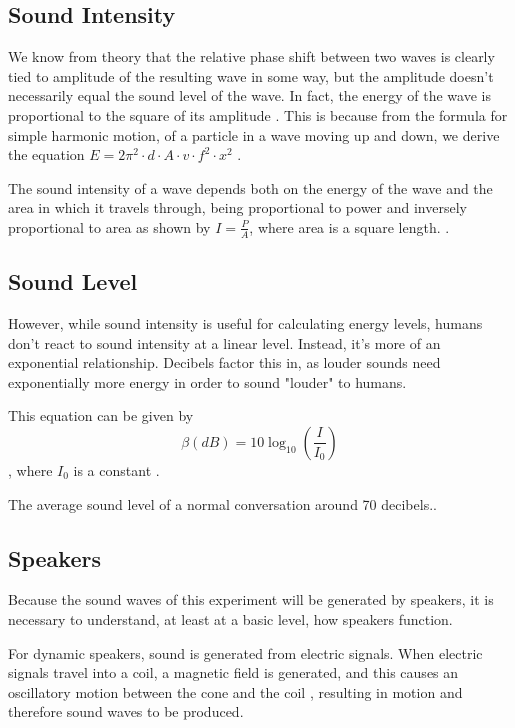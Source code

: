\documentclass[index]{subfiles}
\begin{document}
\subsection{Sound Intensity}

We know from theory that the relative phase shift between two waves is clearly tied to amplitude of the resulting wave in some way, but the amplitude doesn't necessarily equal the sound level of the wave. In fact, the energy of the wave is proportional to the square of its amplitude \cite{openstax}. This is because from the formula for simple harmonic motion, of a particle in a wave moving up and down, we derive the equation \(E=2\pi^2\cdot d\cdot A\cdot v\cdot f^2\cdot x^2\) \cite{giancoli1995physics}.


The sound intensity of a wave depends both on the energy of the wave and the area in which it travels through, being proportional to power and inversely proportional to area as shown by \(I=\frac{P}{A}\), where area is a square length. \cite{openstax}.

\subsection{Sound Level}

However, while sound intensity is useful for calculating energy levels, humans don't react to sound intensity at a linear level. Instead, it's more of an exponential relationship. Decibels factor this in, as louder sounds need exponentially more energy in order to sound "louder" to humans.

This equation can be given by
$$
    \beta\left(dB\right)=10\log_{10}\left(\frac{I}{I_{0}}\right)
$$, where \(I_{0}\) is a constant \cite{openstax}.

The average sound level of a normal conversation around 70 decibels.\cite{speakers}.

\subsection{Speakers}

Because the sound waves of this experiment will be generated by speakers, it is necessary to understand, at least at a basic level, how speakers function. \cite{speakers}

For dynamic speakers, sound is generated from electric signals. When electric signals travel into a coil, a magnetic field is generated, and this causes an oscillatory motion between the cone and the coil \cite{openstax} \cite{speakers}, resulting in motion and therefore sound waves to be produced.
\end{document}
